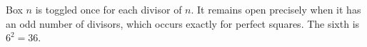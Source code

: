 Box $n$ is toggled once for each divisor of $n$. It remains open precisely when it has an odd number of divisors, which occurs exactly for perfect squares. The sixth is $6^2=\boxed{36}$.
